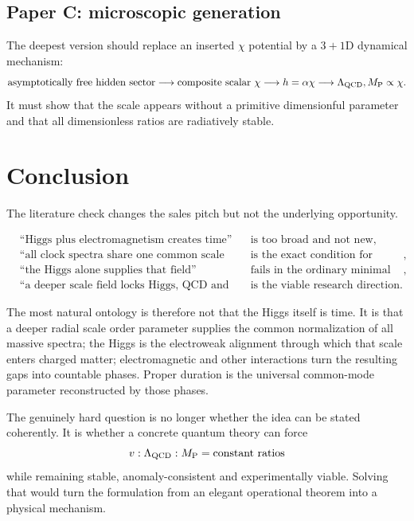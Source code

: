 \documentclass[11pt,a4paper]{article}
\newcommand{\MP}{M_{\mathrm P}}
\begin{document}
\subsection{Paper C: microscopic generation}

The deepest version should replace an inserted $\chi$ potential by a $3+1$D dynamical mechanism:
\[
 \text{asymptotically free hidden sector}
 \longrightarrow
 \text{composite scalar }\chi
 \longrightarrow
 h=\alpha\chi
 \longrightarrow
 \Lambda_{\rm QCD},\MP\propto\chi.
\]
It must show that the scale appears without a primitive dimensionful parameter and that all dimensionless ratios are radiatively stable.

\section{Conclusion}

The literature check changes the sales pitch but not the underlying opportunity.

\[
\boxed{
\begin{aligned}
&\text{``Higgs plus electromagnetism creates time''} &&\text{is too broad and not new},\\[1mm]
&\text{``all clock spectra share one common scale field''} &&\text{is the exact condition for metric time},\\[1mm]
&\text{``the Higgs alone supplies that field''} &&\text{fails in the ordinary minimal theory},\\[1mm]
&\text{``a deeper scale field locks Higgs, QCD and gravity''} &&\text{is the viable research direction}.
\end{aligned}
}
\]

The most natural ontology is therefore not that the Higgs itself is time. It is that a deeper radial scale order parameter supplies the common normalization of all massive spectra; the Higgs is the electroweak alignment through which that scale enters charged matter; electromagnetic and other interactions turn the resulting gaps into countable phases. Proper duration is the universal common-mode parameter reconstructed by those phases.

The genuinely hard question is no longer whether the idea can be stated coherently. It is whether a concrete quantum theory can force
\[
 v:\Lambda_{\rm QCD}:\MP=\text{constant ratios}
\]
while remaining stable, anomaly-consistent and experimentally viable. Solving that would turn the formulation from an elegant operational theorem into a physical mechanism.
\end{document}
